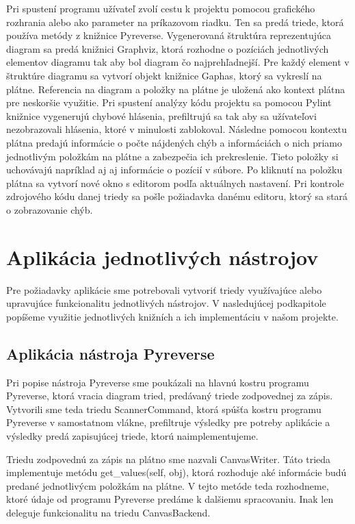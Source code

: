 \documentclass[11pt,oneside,final]{fithesis2}
\begin{document}
Pri spustení programu užívateľ zvolí cestu k projektu pomocou grafického rozhrania alebo ako parameter na príkazovom riadku. Ten sa predá triede, ktorá používa metódy z knižnice Pyreverse. Vygenerovaná štruktúra reprezentujúca diagram sa predá knižnici Graphviz, ktorá rozhodne o pozíciách jednotlivých elementov diagramu tak aby bol diagram čo najprehľadnejší. Pre každý element v štruktúre diagramu sa vytvorí objekt knižnice Gaphas, ktorý sa vykreslí na plátne. Referencia na diagram a položky na plátne je uložená ako kontext plátna pre neskoršie využitie. Pri spustení analýzy kódu projektu sa pomocou Pylint knižnice vygenerujú chybové hlásenia, prefiltrujú sa tak aby sa užívateľovi nezobrazovali hlásenia, ktoré v minulosti zablokoval. Následne pomocou kontextu plátna predajú informácie o počte nájdených chýb a informáciách o nich priamo jednotlivým položkám na plátne a zabezpečia ich prekreslenie. Tieto položky si uchovávajú napríklad aj aj informácie o pozícií v súbore. Po kliknutí na položku plátna sa vytvorí nové okno s editorom podľa aktuálnych nastavení. Pri kontrole zdrojového kódu danej triedy sa pošle požiadavka danému editoru, ktorý sa stará o zobrazovanie chýb.

	
	\section{Aplikácia jednotlivých nástrojov}
	Pre požiadavky aplikácie sme potrebovali vytvoriť triedy využívajúce alebo upravujúce funkcionalitu jednotlivých nástrojov. V nasledujúcej podkapitole popíšeme využitie jednotlivých knižních a ich implementáciu v našom projekte.
	
		\subsection{Aplikácia nástroja Pyreverse}	
			Pri popise nástroja Pyreverse sme poukázali na hlavnú kostru programu Pyreverse, ktorá vracia diagram tried, predávaný triede zodpovednej za zápis. Vytvorili sme teda triedu ScannerCommand, ktorá spúšťa kostru programu Pyreverse v samostatnom vlákne, prefiltruje výsledky pre potreby aplikácie a výsledky predá zapisujúcej triede, ktorú naimplementujeme.
			
			Triedu zodpovednú za zápis na plátno sme nazvali CanvasWriter. Táto trieda  implementuje metódu get\_values(self, obj), ktorá rozhoduje aké informácie budú predané jednotlivýcm položkám na plátne. V tejto metóde teda rozhodneme, ktoré údaje od programu Pyreverse predáme k dalšiemu spracovaniu. Inak len deleguje funkcionalitu na triedu CanvasBackend.
		
\end{document}
